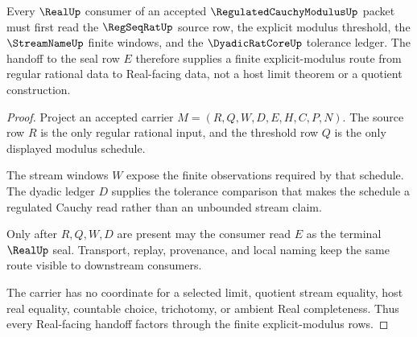 \begin{theorem}
\label{thm:regulated-cauchy-modulus-real-handoff}
Every $\RealUp$ consumer of an accepted $\RegulatedCauchyModulusUp$ packet must first read the $\RegSeqRatUp$ source row, the explicit modulus threshold, the $\StreamNameUp$ finite windows, and the $\DyadicRatCoreUp$ tolerance ledger. The handoff to the seal row $E$ therefore supplies a finite explicit-modulus route from regular rational data to Real-facing data, not a host limit theorem or a quotient construction.
\end{theorem}
\begin{proof}
Project an accepted carrier $M=(R,Q,W,D,E,H,C,P,N)$. The source row $R$ is the only regular rational input, and the threshold row $Q$ is the only displayed modulus schedule.

The stream windows $W$ expose the finite observations required by that schedule. The dyadic ledger $D$ supplies the tolerance comparison that makes the schedule a regulated Cauchy read rather than an unbounded stream claim.

Only after $R,Q,W,D$ are present may the consumer read $E$ as the terminal $\RealUp$ seal. Transport, replay, provenance, and local naming keep the same route visible to downstream consumers.

The carrier has no coordinate for a selected limit, quotient stream equality, host real equality, countable choice, trichotomy, or ambient Real completeness. Thus every Real-facing handoff factors through the finite explicit-modulus rows.
\end{proof}

